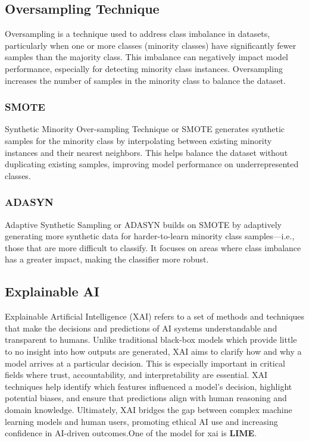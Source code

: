\subsection{Oversampling Technique}
Oversampling is a technique used to address class imbalance in datasets, particularly when one or more classes (minority classes) have significantly fewer samples than the majority class. This imbalance can negatively impact model performance, especially for detecting minority class instances. Oversampling increases the number of samples in the minority class to balance the dataset.
\subsubsection{SMOTE} Synthetic Minority Over-sampling Technique or SMOTE generates synthetic samples for the minority class by interpolating between existing minority instances and their nearest neighbors. This helps balance the dataset without duplicating existing samples, improving model performance on underrepresented classes.

\subsubsection{ADASYN} Adaptive Synthetic Sampling or ADASYN builds on SMOTE by adaptively generating more synthetic data for harder-to-learn minority class samples—i.e., those that are more difficult to classify. It focuses on areas where class imbalance has a greater impact, making the classifier more robust.

\subsection{Explainable AI}
Explainable Artificial Intelligence (XAI) refers to a set of methods and techniques that make the decisions and predictions of AI systems understandable and transparent to humans. Unlike traditional black-box models which provide little to no insight into how outputs are generated, XAI aims to clarify how and why a model arrives at a particular decision. This is especially important in critical fields where trust, accountability, and interpretability are essential. XAI techniques help identify which features influenced a model’s decision, highlight potential biases, and ensure that predictions align with human reasoning and domain knowledge. Ultimately, XAI bridges the gap between complex machine learning models and human users, promoting ethical AI use and increasing confidence in AI-driven outcomes.One of the model for xai is \textbf{LIME}.

